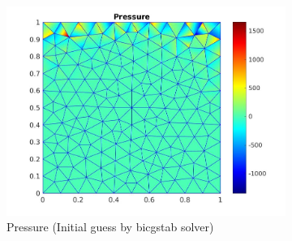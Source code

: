 \documentclass[a4paper]{book}
\begin{document}
\begin{figure}
\begin{subfigure}{\textwidth}
  \includegraphics[width=\linewidth]{lid_newton_pressure_bicgstab.jpg}
  \caption{Pressure (Initial guess by bicgstab solver)}
  \label{pressure_navier_stoke_bicgstab_lid}
\end{subfigure}
\caption{\label{lid_driven_cavity_n_s_bicgstab}}
\end{figure}
\end{document}
